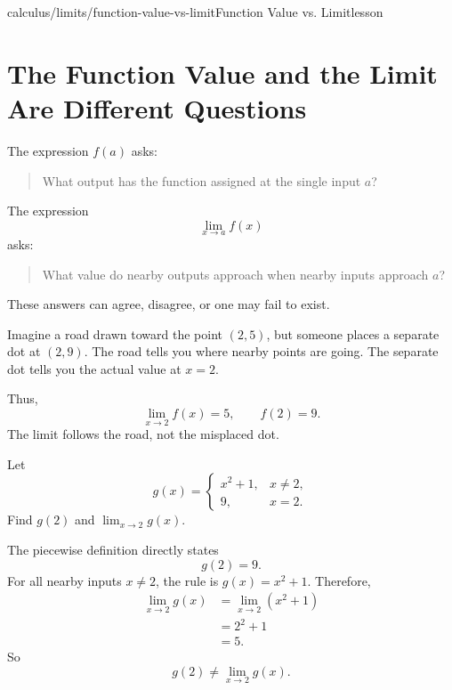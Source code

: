 \begin{webpage}{calculus/limits/function-value-vs-limit}{Function Value vs. Limit}{lesson}
\section{The Function Value and the Limit Are Different Questions}


The expression \(f(a)\) asks:

\begin{quote}
What output has the function assigned at the single input \(a\)?
\end{quote}

The expression
\[
  \lim_{x\to a}f(x)
\]
asks:

\begin{quote}
What value do nearby outputs approach when nearby inputs approach \(a\)?
\end{quote}

These answers can agree, disagree, or one may fail to exist.

\begin{bgguided}[title={The dot and the road}]
Imagine a road drawn toward the point \((2,5)\), but someone places a separate dot at \((2,9)\). The road tells you where nearby points are going. The separate dot tells you the actual value at \(x=2\).

Thus,
\[
  \lim_{x\to2}f(x)=5,
  \qquad
  f(2)=9.
\]
The limit follows the road, not the misplaced dot.
\end{bgguided}



\begin{bgexample}[title={A piecewise value does not control the limit}]
Let
\[
  g(x)=
  \begin{cases}
    x^2+1,&x\ne2,\\
    9,&x=2.
  \end{cases}
\]
Find \(g(2)\) and \(\lim_{x\to2}g(x)\).

\begin{bgsolution}
The piecewise definition directly states
\[
  \boxed{g(2)=9}.
\]
For all nearby inputs \(x\ne2\), the rule is \(g(x)=x^2+1\). Therefore,
\[
\begin{aligned}
\lim_{x\to2}g(x)
&=\lim_{x\to2}(x^2+1)\\
&=2^2+1\\
&=\boxed{5}.
\end{aligned}
\]
So
\[
  g(2)\ne\lim_{x\to2}g(x).
\]
\end{bgsolution}
\end{bgexample}


\end{webpage}
